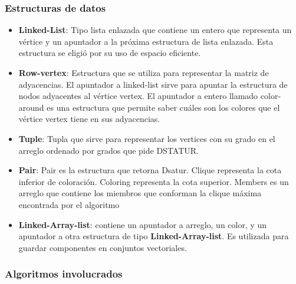 \documentclass[a4paper,10pt]{article}
\begin{document}
\subsubsection{Estructuras de datos}
\begin{itemize}
 \item \textbf{Linked-List}:  Tipo lista enlazada que contiene un entero que representa un vértice y un apuntador
 a la próxima estructura de lista enlazada. Esta estructura se eligió por su uso de espacio eficiente.
 \item \textbf{Row-vertex}: Estructura que se utiliza para representar
la matriz de adyacencias. El apuntador a linked-list
sirve para apuntar la estructura de nodos adyacentes
al vértice vertex. El apuntador a entero llamado
color-around es una estructura que permite saber
cuáles son los colores que el vértice vertex tiene
en sus adyacencias.
 \item \textbf{Tuple}: Tupla que sirve para representar los vertices con su 
 grado en el arreglo ordenado por grados que pide DSTATUR.
 \item \textbf{Pair}: Pair es la estructura que retorna Dsatur.
Clique representa la cota inferior de coloración.
Coloring representa la cota superior.
Members es un arreglo que contiene los miembros
que conforman la clique máxima encontrada por el algoritmo
 \item \textbf{Linked-Array-list}: contiene un apuntador a arreglo, un color, y un apuntador a otra estructura 
de tipo \textbf{Linked-Array-list}. Es utilizada para guardar componentes en conjuntos vectoriales.
\end{itemize}

\subsubsection{Algoritmos involucrados}
\end{document}

